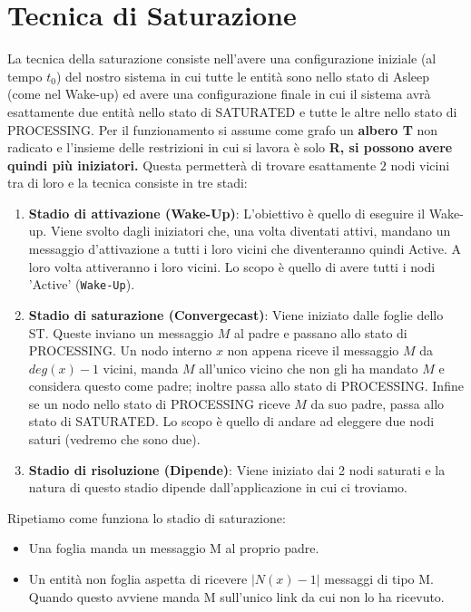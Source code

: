 \section{Tecnica di Saturazione}
La tecnica della saturazione consiste nell'avere una configurazione iniziale (al tempo $t_0$) del nostro sistema in cui tutte le entità sono nello stato di Asleep (come nel Wake-up) ed avere una configurazione finale in cui il sistema avrà esattamente due entità nello stato di SATURATED e tutte le altre nello stato di PROCESSING. Per il funzionamento si assume come grafo un \textbf{albero T} non radicato e l'insieme delle restrizioni in cui si lavora è solo \textbf{R, si possono avere quindi più iniziatori.} Questa permetterà di trovare esattamente $2$ nodi vicini tra di loro e la tecnica consiste in tre stadi: %
\begin{enumerate}
  \item \textbf{Stadio di attivazione (Wake-Up)}: L'obiettivo è quello di eseguire il Wake-up. Viene svolto dagli iniziatori che, una volta diventati attivi, mandano un messaggio d'attivazione a tutti i loro vicini che diventeranno quindi Active. A loro volta attiveranno i loro vicini. Lo scopo è quello di avere tutti i nodi 'Active' (\texttt{Wake-Up}).
  \item \textbf{Stadio di saturazione (Convergecast)}: Viene iniziato dalle foglie dello ST. Queste inviano un messaggio $M$ al padre e passano allo stato di PROCESSING. Un nodo interno $x$ non appena riceve il messaggio $M$ da $deg(x) -1$ vicini, manda $M$ all'unico vicino che non gli ha mandato $M$ e considera questo come padre; inoltre passa allo stato di PROCESSING. Infine se un nodo nello stato di PROCESSING riceve $M$ da suo padre, passa allo stato di SATURATED. Lo scopo è quello di andare ad eleggere due nodi saturi (vedremo che sono due).
  \item \textbf{Stadio di risoluzione (Dipende)}:
  Viene iniziato dai 2 nodi saturati e la natura di questo stadio dipende dall'applicazione in cui ci troviamo.
\end{enumerate}
Ripetiamo come funziona lo stadio di saturazione:
\begin{itemize}
    \item Una foglia manda un messaggio M al proprio padre.
    \item Un entità non foglia aspetta di ricevere $|N(x)-1|$ messaggi di tipo M. Quando questo avviene manda M sull'unico link da cui non lo ha ricevuto.
\end{itemize}
